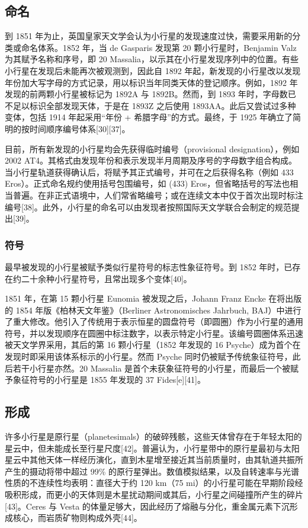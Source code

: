 \subsection{命名}
到 1851 年为止，英国皇家天文学会认为小行星的发现速度过快，需要采用新的分类或命名体系。1852 年，当 de Gasparis 发现第 20 颗小行星时，Benjamin Valz 为其赋予名称和序号，即 20 Massalia，以示其在小行星发现序列中的位置。有些小行星在发现后未能再次被观测到，因此自 1892 年起，新发现的小行星改以发现年份加大写字母的方式记录，用以标识当年同类天体的登记顺序。例如，1892 年发现的前两颗小行星被标记为 1892A 与 1892B。然而，到 1893 年时，字母数已不足以标识全部发现天体，于是在 1893Z 之后使用 1893AA。此后又尝试过多种变体，包括 1914 年起采用“年份 + 希腊字母”的方式。最终，于 1925 年确立了简明的按时间顺序编号体系[30][37]。

目前，所有新发现的小行星均会先获得临时编号（provisional designation），例如 2002 AT4。其格式由发现年份和表示发现半月周期及序号的字母数字组合构成。当小行星轨道获得确认后，将赋予其正式编号，并可在之后获得名称（例如 433 Eros）。正式命名规约使用括号包围编号，如 (433) Eros，但省略括号的写法也相当普遍。在非正式语境中，人们常省略编号；或在连续文本中仅于首次出现时标注编号[38]。此外，小行星的命名可以由发现者按照国际天文学联合会制定的规范提出[39]。
\subsubsection{符号}  
最早被发现的小行星被赋予类似行星符号的标志性象征符号。到 1852 年时，已存在约二十余种小行星符号，且常出现多个变体[40]。

1851 年，在第 15 颗小行星 Eunomia 被发现之后，Johann Franz Encke 在将出版的 1854 年版《柏林天文年鉴》（Berliner Astronomisches Jahrbuch, BAJ）中进行了重大修改。他引入了传统用于表示恒星的圆盘符号（即圆圈）作为小行星的通用符号，并以发现顺序在圆圈中标注数字，以表示特定小行星。该编号圆圈体系迅速被天文学界采用，其后的第 16 颗小行星（1852 年发现的 16 Psyche）成为首个在发现时即采用该体系标示的小行星。然而 Psyche 同时仍被赋予传统象征符号，此后若干小行星亦然。20 Massalia 是首个未获象征符号的小行星，而最后一个被赋予象征符号的小行星是 1855 年发现的 37 Fides[e][41]。
\subsection{形成} 
许多小行星是原行星（planetesimals）的破碎残骸，这些天体曾存在于年轻太阳的星云中，但未能成长至行星尺度[42]。普遍认为，小行星带中的原行星最初与太阳星云中其他天体一样经历演化，直到木星增至接近其当前质量时，由其轨道共振所产生的摄动将带中超过 99\% 的原行星弹出。数值模拟结果，以及自转速率与光谱性质的不连续性均表明：直径大于约 120 km（75 mi）的小行星可能在早期阶段经吸积形成，而更小的天体则是木星扰动期间或其后，小行星之间碰撞所产生的碎片[43]。Ceres 与 Vesta 的体量足够大，因此经历了熔融与分化，重金属元素下沉形成核心，而岩质矿物则构成外壳[44]。

